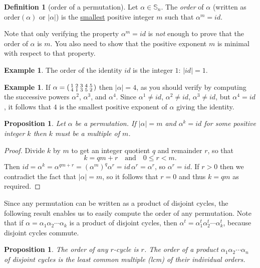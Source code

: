 \documentclass[11pt]{article}
\newtheorem{prop}[thm]{Proposition}
\theoremstyle{definition}
\newtheorem{defn}[thm]{Definition}
\newtheorem{example}[thm]{Example}
\newcommand{\Sym}{\mathbb{S}}
\newenvironment{perm}[2]{\left(\begin{smallmatrix}#1 \\ #2}{\end{smallmatrix}\right)}
\begin{document}
\begin{defn}[order of a permutation]
Let $\alpha \in \Sym_n$.  The {\em order} of $\alpha$ (written as
$\text{order}(\alpha)$ or $|\alpha|$) is the \underline{smallest}
positive integer $m$ such that $\alpha^m = id$.
\end{defn}

Note that only verifying the property $\alpha^m = id$ is \emph{not}
enough to prove that the order of $\alpha$ is $m$. You also need to
show that the positive exponent $m$ is minimal with respect to that
property. 

\begin{example}
  The order of the identity $id$ is the integer $1$: $|id| = 1$. 
\end{example}

\begin{example}
  If $\alpha = \begin{perm}{1&2&3&4&5}{4&1&3&5&2}\end{perm}$ then
  $|\alpha| = 4$, as you should verify by computing the successive
  powers $\alpha^2$, $\alpha^3$, and $\alpha^4$. Since $\alpha^1 \ne
  id$, $\alpha^2 \ne id$, $\alpha^3 \ne id$, but $\alpha^4 = id$, it
  follows that $4$ is the smallest positive exponent of $\alpha$
  giving the identity.
\end{example}

\begin{prop}
  Let $\alpha$ be a permutation. If $|\alpha|=m$ and $\alpha^k = id$
  for some positive integer $k$ then $k$ must be a multiple of $m$.
\end{prop}

\begin{proof}
Divide $k$ by $m$ to get an integer quotient $q$ and remainder $r$, so
that
\[
  k = qm+r \quad\text{and}\quad 0 \le r < m.
\]
Then $id = \alpha^k = \alpha^{qm+r} = (\alpha^m)^q \alpha^r = id\,
\alpha^r = \alpha^r$, so $\alpha^r = id$. If $r>0$ then we contradict
the fact that $|\alpha|=m$, so it follows that $r=0$ and thus $k = qm$
as required.
\end{proof}

Since any permutation can be written as a product of disjoint cycles,
the following result enables us to easily compute the order of any
permutation. Note that if $\alpha = \alpha_1 \alpha_2 \cdots \alpha_k$
is a product of disjoint cycles, then $\alpha^t = \alpha_1^t \alpha_2^t
\cdots \alpha_k^t$, because disjoint cycles commute.

\begin{prop} \label{B:order}
The order of any $r$-cycle is $r$.  The order of a product $\alpha_1
\alpha_2 \cdots \alpha_n$ of {\em disjoint} cycles is the least common
multiple (lcm) of their individual orders.
\end{prop}
\end{document}
